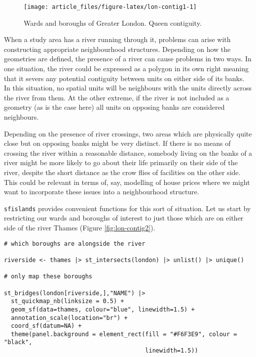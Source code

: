 \begin{figure}

{\centering \texttt{[image: article\_files/figure-latex/lon-contig1-1]} 

}

\caption{Wards and boroughs of Greater London. Queen contiguity. }\label{fig:lon-contig1}
\end{figure}

When a study area has a river running through it, problems can arise with constructing appropriate neighbourhood structures. Depending on how the
geometries are defined, the presence of a river can cause problems in two ways. In one situation, the river could be expressed as a polygon in its own right meaning that it severs any potential contiguity between units on either side of its banks. In this situation, no spatial units will be neighbours with the units directly across the river from them. At the other extreme, if the river is not included as a geometry (as is the case here) all units on opposing banks are considered neighbours.

Depending on the presence of river crossings, two areas which are physically quite close but on opposing banks might be very distinct. If there is no means of crossing the river within a reasonable distance, somebody living on the banks of a river might be more likely to go about their life primarily on their side of the river, despite the short distance as the crow flies of facilities on the other side. This could be relevant in terms of, say, modelling of house prices where we might want to incorporate these issues into a neighbourhood structure.

\texttt{sfislands} provides convenient functions for this sort of situation. Let us start by restricting our wards and boroughs of interest to just those which are on either side of the river Thames (Figure \ref{fig:lon-contig2}).

\begin{verbatim}
# which boroughs are alongside the river

riverside <- thames |> st_intersects(london) |> unlist() |> unique()

# only map these boroughs

st_bridges(london[riverside,],"NAME") |> 
  st_quickmap_nb(linksize = 0.5) +
  geom_sf(data=thames, colour="blue", linewidth=1.5) + 
  annotation_scale(location="br") +
  coord_sf(datum=NA) + 
  theme(panel.background = element_rect(fill = "#F6F3E9", colour = "black", 
                                        linewidth=1.5))
\end{verbatim}

